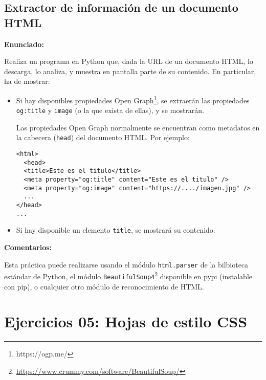 \subsection{Extractor de información de un documento HTML}
\label{subsec:html-extractor}

\textbf{Enunciado:}

Realiza un programa en Python que, dada la URL de un documento HTML, lo descarga, lo analiza, y muestra en pantalla parte de su contenido. En particular, ha de mostrar:

\begin{itemize}
\item Si hay disponibles propiedades Open Graph\footnote{https://ogp.me/}, se extraerán las propiedades \texttt{og:title} y \texttt{image} (o la que exista de ellas), y se mostrarán.

  Las propiedades Open Graph normalmente se encuentran como metadatos en la cabecera (\texttt{head}) del documento HTML. Por ejemplo:

\begin{verbatim}
<html>
  <head>
  <title>Este es el titulo</title>
  <meta property="og:title" content="Este es el titulo" />
  <meta property="og:image" content="https://..../imagen.jpg" />
  ...
</head>
...
\end{verbatim}

\item Si hay disponible un elemento \texttt{title}, se mostrará su contenido.
\end{itemize}

\textbf{Comentarios:}

Esta práctica puede realizarse usando el módulo \texttt{html.parser} de la bilbioteca estándar de Python, el módulo \texttt{BeautifulSoup4}\footnote{\url{https://www.crummy.com/software/BeautifulSoup/}} disponible en pypi (instalable con pip), o cualquier otro módulo de reconocimiento de HTML.

\section{Ejercicios 05: Hojas de estilo CSS}

